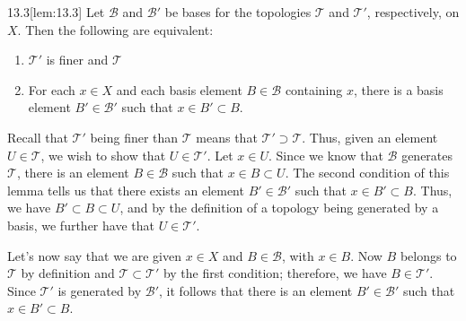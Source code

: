 \begin{thmBox}[Lemma]{13.3}[lem:13.3]
    Let \( \mathcal{B} \) and \( \mathcal{B}' \) be bases for the topologies 
    \( \mathcal{T} \) and \( \mathcal{T}' \), respectively, on \( X \).
    Then the following are equivalent: 
    \begin{enumerate}
        \item \( \mathcal{T}' \) is finer and \( \mathcal{T} \)
        \item For each \( x \in X \) and each basis element 
            \( B \in \mathcal{B} \) containing \( x \), there is a basis element
            \( B' \in \mathcal{B}' \) such that \( x \in B' \subset B \).
    \end{enumerate}

    \baseRule

    \begin{proofBox}
        \baseSkip 

        Recall that \( \mathcal{T}' \) being finer than \( \mathcal{T} \) means 
        that \( \mathcal{T}' \supset \mathcal{T} \).
        Thus, given an element \( U \in \mathcal{T} \), we wish to show that 
        \( U \in \mathcal{T}' \).
        Let \( x \in U \). 
        Since we know that \( \mathcal{B} \) generates \( \mathcal{T} \), there 
        is an element \( B \in \mathcal{B} \) such that 
        \( x \in B \subset U \). 
        The second condition of this lemma tells us that there exists an element
        \( B' \in \mathcal{B}' \) such that \( x \in B' \subset B \).
        Thus, we have \( B' \subset B \subset U \), and by the definition of a 
        topology being generated by a basis, we further have that 
        \( U \in \mathcal{T}' \).

        \baseSkip
        Let's now say that we are given \( x \in X \) and 
        \( B \in \mathcal{B} \), with \( x \in B \). 
        Now \( B \) belongs to \( \mathcal{T} \) by definition and
        \( \mathcal{T} \subset \mathcal{T}' \) by the first condition;
        therefore, we have \( B \in \mathcal{T}' \).
        Since \( \mathcal{T}' \) is generated by \( \mathcal{B}' \), it follows 
        that there is an element \( B' \in \mathcal{B}' \) such that
        \( x \in B' \subset B \).
    \end{proofBox}
\end{thmBox}

